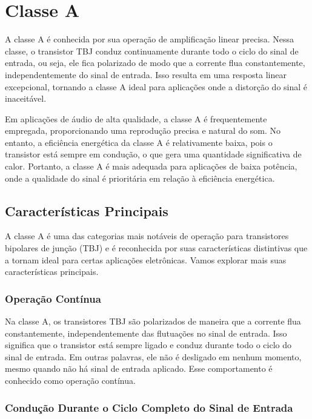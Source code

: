 \section{Classe A}

A classe A é conhecida por sua operação de amplificação linear precisa. Nessa classe, o transistor TBJ conduz continuamente durante todo o ciclo do sinal de entrada, ou seja, ele fica polarizado de modo que a corrente flua constantemente, independentemente do sinal de entrada. Isso resulta em uma resposta linear excepcional, tornando a classe A ideal para aplicações onde a distorção do sinal é inaceitável.

Em aplicações de áudio de alta qualidade, a classe A é frequentemente empregada, proporcionando uma reprodução precisa e natural do som. No entanto, a eficiência energética da classe A é relativamente baixa, pois o transistor está sempre em condução, o que gera uma quantidade significativa de calor. Portanto, a classe A é mais adequada para aplicações de baixa potência, onde a qualidade do sinal é prioritária em relação à eficiência energética.

\subsection{Características Principais}

A classe A é uma das categorias mais notáveis de operação para transistores bipolares de junção (TBJ) e é reconhecida por suas características distintivas que a tornam ideal para certas aplicações eletrônicas. Vamos explorar mais suas características principais.

\subsubsection{Operação Contínua}

Na classe A, os transistores TBJ são polarizados de maneira que a corrente flua constantemente, independentemente das flutuações no sinal de entrada. Isso significa que o transistor está sempre ligado e conduz durante todo o ciclo do sinal de entrada. Em outras palavras, ele não é desligado em nenhum momento, mesmo quando não há sinal de entrada aplicado. Esse comportamento é conhecido como operação contínua.

\subsubsection{Condução Durante o Ciclo Completo do Sinal de Entrada}

